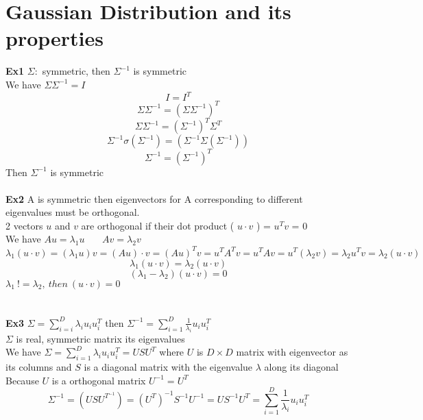 \documentclass{article}
\begin{document}
\section{Gaussian Distribution and its properties}
\textbf{Ex1}
$\Sigma:$ symmetric, then  $\Sigma ^ {-1}$ is symmetric
\\
We have $\Sigma \Sigma ^ {-1} = I$\\
$$ I = I^{T}$$
$$ \Sigma \Sigma ^ {-1} = (\Sigma \Sigma ^ {-1})^{T}$$
$$\Sigma \Sigma ^{-1} = (\Sigma ^ {-1}) ^ {T} \Sigma ^ {T}$$
$$ \Sigma ^ {-1} \sigma (\Sigma ^ {-1}) = (\Sigma ^ {-1} \Sigma (\Sigma ^ {-1}))$$
$$ \Sigma ^ {-1} = (\Sigma ^ {-1}) ^ {T}$$
Then $\Sigma ^ {-1}$ is symmetric
\\
\\
\textbf{Ex2}
A is symmetric then eigenvectors for A corresponding to different eigenvalues must be orthogonal.\\
2 vectors $u$ and $v$ are orthogonal if their dot product ( $u \cdot v$ ) = $u^{T} v$ = 0\\
We have $ A u = \lambda_1 u $ \ \ \   $Av = \lambda_2 v$\\
$$\lambda_1 (u \cdot v) = (\lambda_1 u) v = (Au)\cdot v = (Au)^{T} v = u^{T} A^{T} v = u^{T} A v = u^{T} (\lambda_2 v) = \lambda_2 u^{T}v = \lambda_2 (u \cdot v) $$
$$\lambda_1(u \cdot v) = \lambda_2 (u \cdot v)$$
$$(\lambda_1 - \lambda_2)(u \cdot v) = 0$$
$\lambda_1 \ != \lambda_2, \ then \ (u \cdot v) = 0$
\\ 
\\ 
\\
\textbf{Ex3} $\Sigma = \sum_{i=i}^{D}\lambda_i u_i u_i ^{T}$ then $\Sigma ^ {-1} = \sum_{i = 1}^{D} \frac{1}{\lambda_i}u_i u_i^{T}$\\
$\Sigma$ is real, symmetric matrix its eigenvalues\\
We have $\Sigma = \sum_{i = 1}^{D} \lambda_i u_i u_i ^{T} = U S U ^{T}$ where $U$ is $D \times D$ matrix with eigenvector as its columns and $S$ is a diagonal matrix with the eigenvalue $\lambda$ along its diagonal\\
Because $U$ is a orthogonal matrix $U ^ {-1} = U^{T}$\\
$$\Sigma ^ {-1} = (U S U^{T}^{-1}) = (U^{T})^{-1}S^{-1}U^{-1} = U S^{-1} U^{T} = \sum_{i=1}^{D} \frac{1}{\lambda_i} u_i u_i^{T}$$
\end{document}
